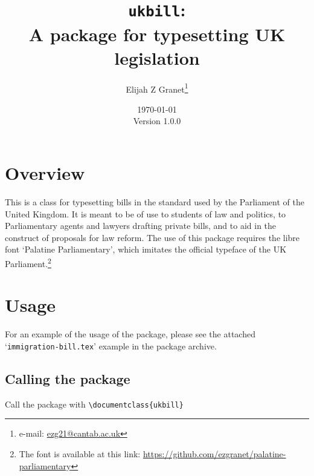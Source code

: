 \documentclass{article}
\date{\today\\\smallskip\ttfamily Version 1.0.0}
\author{Elijah Z Granet\thanks{e-mail: \href{mailto:ezg21@cantab.ac.uk}{\ttfamily ezg21@cantab.ac.uk}}}
\title{\texttt{ukbill}:\\A package for typesetting UK legislation}
\begin{document}
\maketitle
\tableofcontents
\clearpage
\section{Overview}
This is a class for typesetting bills in the standard used by the Parliament of the United Kingdom. It is meant to be of use to students of law and politics, to Parliamentary agents and lawyers drafting private bills, and to aid in the construct of proposals for law reform. The use of this package requires the libre font `Palatine Parliamentary', which imitates the official typeface of the UK Parliament.\footnote{The font is available at this link: \url{https://github.com/ezgranet/palatine-parliamentary}}
\section{Usage}
For an example of the usage of the package, please see the attached `\texttt{immigration-bill.tex}' example in the package archive.

\subsection{Calling the package}
Call the package with {\color{darkspringgreen}\ttfamily \verb|\documentclass{ukbill}|}
\end{document}
